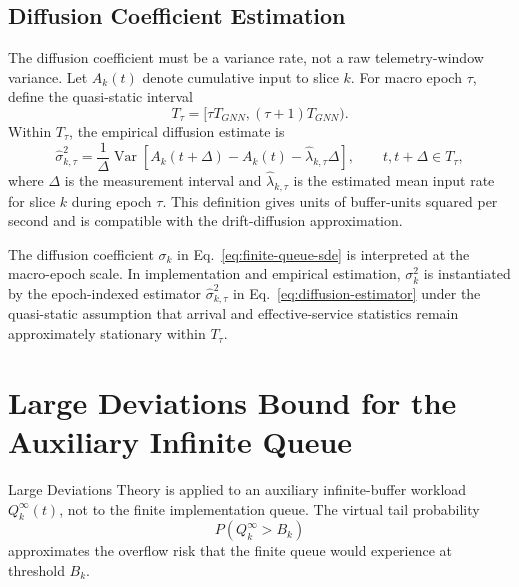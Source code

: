 \subsection{Diffusion Coefficient Estimation}
\label{sec:diffusion}

The diffusion coefficient must be a variance rate, not a raw telemetry-window variance.
Let $A_k(t)$ denote cumulative input to slice $k$. For macro epoch $\tau$, define the
quasi-static interval
\begin{equation}
  T_\tau=[\tau T_{GNN},(\tau+1)T_{GNN}).
  \label{eq:macro-epoch}
\end{equation}
Within $T_\tau$, the empirical diffusion estimate is
\begin{equation}
  \hat{\sigma}_{k,\tau}^2
  =
  \frac{1}{\Delta}
  \operatorname{Var}
  \left[
    A_k(t+\Delta)-A_k(t)-\hat{\lambda}_{k,\tau}\Delta
  \right],
  \qquad t,t+\Delta\in T_\tau,
  \label{eq:diffusion-estimator}
\end{equation}
where $\Delta$ is the measurement interval and $\hat{\lambda}_{k,\tau}$ is the
estimated mean input rate for slice $k$ during epoch $\tau$. This definition gives
units of buffer-units squared per second and is compatible with the drift-diffusion
approximation.

The diffusion coefficient $\sigma_k$ in Eq.~\eqref{eq:finite-queue-sde} is interpreted
at the macro-epoch scale. In implementation and empirical estimation, $\sigma_k^2$ is
instantiated by the epoch-indexed estimator $\hat{\sigma}^{2}_{k,\tau}$ in
Eq.~\eqref{eq:diffusion-estimator} under the quasi-static assumption that arrival and
effective-service statistics remain approximately stationary within $T_\tau$.

\section{Large Deviations Bound for the Auxiliary Infinite Queue}
\label{sec:ldt}

Large Deviations Theory is applied to an auxiliary infinite-buffer workload
$Q_k^{\infty}(t)$, not to the finite implementation queue. The virtual tail probability
\begin{equation}
  P(Q_k^{\infty}>B_k)
  \label{eq:virtual-tail-probability}
\end{equation}
approximates the overflow risk that the finite queue would experience at threshold
$B_k$.

